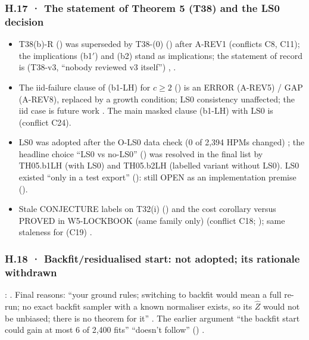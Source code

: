 \subsubsection*{H.17 · The statement of Theorem 5 (T38) and the LS0 decision}
\begin{itemize}[leftmargin=1.3em]
\item T38(b)-R () was superseded by T38-(0) () after A-REV1 (conflicts C8, C11); the implications (b1$'$)  and (b2)  stand as implications; the statement of record is  (T38-v3, ``nobody reviewed v3 itself'') , .
\item The iid-failure clause of (b1-LH) for $c\ge2$ () is an ERROR (A-REV5) / GAP (A-REV8), replaced by a growth condition; LS0 consistency unaffected; the iid case is future work  . The main masked clause (b1-LH) with LS0 is  (conflict C24).
\item LS0 was adopted after the O-LS0 data check (0 of 2,394 HPMs changed) ; the headline choice ``LS0 vs no-LS0'' () was resolved in the final list by TH05.b1LH (with LS0) and TH05.b2LH (labelled variant without LS0). LS0 existed ``only in a test export'' (): still OPEN as an implementation premise ().
\item Stale CONJECTURE labels on T32(i) () and the cost corollary  versus PROVED in W5-LOCKBOOK (same family only) (conflict C18; ); same staleness for  (C19) .
\end{itemize}

\subsubsection*{H.18 · Backfit/residualised start: not adopted; its rationale withdrawn}
:  . Final reasons: ``your ground rules; switching to backfit would mean a full re-run; no exact backfit sampler with a known normaliser exists, so its $\hat Z$ would not be unbiased; there is no theorem for it'' . The earlier argument ``the backfit start could gain at most 6 of 2,400 fits'' ``doesn't follow'' () .

